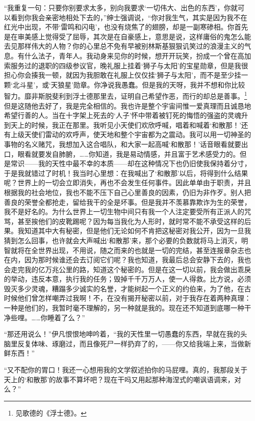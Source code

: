 \par “我重复一句：只要你别要求太多，别向我要求‘一切伟大、出色的东西’，你就可以看到你我会亲密地相处下去的，”绅士强调说，“你对我生气，其实是因为我不在红光中出现，不带‘雷鸣和闪电’，也没有烧焦了的翅膀，却是一副寒碜相。你首先是在审美感上觉得受了屈辱，其次是在自豪感上，意思是说，这样庸俗的鬼怎么能去见那样伟大的人物？你的心里总不免有早被别林斯基狠狠讥笑过的浪漫主义的气息。有什么法子，青年人。我动身来见你的时候，想开开玩笑，扮成一个曾在高加索服务过的退职的四级参议官，晚礼服上挂着‘狮子与太阳’的宝星勋章，但是我很担心你会揍我一顿，就因为我胆敢在礼服上仅仅挂‘狮子与太阳’，而不是至少挂一颗‘北斗星’，或‘天狼星’勋章。你净说我愚蠢。但是我的天呀，我并不想和你比较智力。靡非斯脱斐利到浮士德那里去，证明自己希望作恶，而行的却总是善事。\footnote{见歌德的《浮士德》。}但是这随他去好了，我是完全相信的。我也许是整个宇宙间惟一爱真理而且诚恳地希望行善的人。当在十字架上死去的‘人子’怀中带着被钉死的悔悟的强盗的灵魂升到天上的时候，我正在那里。我听见小天使们欢欣呼喊，唱着和喊着‘和散那！’还有上级天使们雷动的欢呼声，使天地和整个宇宙都为之震动。我可以用一切神圣的事物的名义赌咒，我想加入这合唱队，和大家一起高喊‘和散那！’话音眼看就要出口，眼看就要发自肺腑，……你知道，我是易动情感，并且富于艺术感受力的。但是常识——我的天性中最不幸的本质——却在这种情况下也仍旧使我保持着分寸，于是我就错过了时机！我当时心里想：在我喊出了‘和散那’以后，将得到什么结果呢？世界上的一切会立即消失，再也不会发生任何事件。因此单单由于职责，并且根据我的社会地位，我也不能不压下自己心里善良的因素，仍旧为非作歹。别人把善良的荣誉全都抢走，留给我干的全是坏事。但是我并不羡慕靠欺诈为生的荣誉，我不是好名的。为什么世界上一切生物中间只有我一个人注定要受所有正派人的咒骂，甚至挨他们的皮靴踢呢？因为每当我化为人形时，就时常不能不承受这样的后果。我知道其中大有秘密，但是他们无论如何不肯把这秘密对我公开，因为一旦我猜到怎么回事，也许就会大声喊出‘和散那’来，那个必要的负数就将马上消灭，明智就将在全世界出现，不用说，随之而来的也就是一切的完结，甚至连报章杂志也在内，因为那时候谁还会去订阅它们呢？我也知道，我最后总会安静下去的，我也会走完我的亿万兆公里的路，知道这个秘密的。但是在这一切以前，我会做出乖戾的举动，违反本意，执行我的任务；毁掉千千万万人，使一人得救。比方说，必须毁灭多少灵魂，糟蹋多少诚实的名誉，才能树起一个正义的约伯来，为了他，在古时候他们曾怎样嘲弄过我啊！不，在没有揭开秘密以前，对于我存在着两种真理：一种是他们的，我暂时毫不理解的，另一种就是我的。现在还不知道到底哪一种干净些哩。……你睡着了么？”
\par “那还用说么！”伊凡恨恨地呻吟着，“我的天性里一切愚蠢的东西，早就在我的头脑里反复体味、琢磨过，而且像死尸一样扔弃了的，——你又给我端上来，当做新鲜东西！”
\par “又不配你的胃口！我还一心想用我的文学叙述拍你的马屁哩。真的，我那段关于天上的‘和散那’的故事不算坏吧？现在干吗又用起那种海涅式的嘲讽语调来，对么？”
